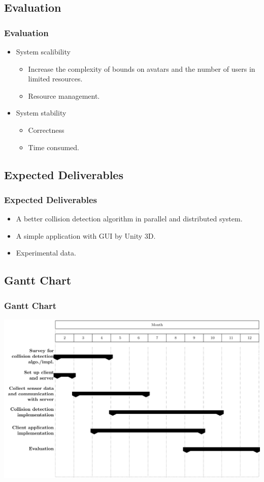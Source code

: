 \documentclass{beamer}
\begin{document}
\subsection{Evaluation}
	\begin{frame}
	\frametitle{Evaluation}
	\begin{itemize}
		\item System scalibility
			\begin{itemize}
				\item Increase the complexity of bounds on avatars and the number of users in limited resources.
				\item Resource management.
			\end{itemize}
		\item System stability
			\begin{itemize}
				\item Correctness
				\item Time consumed.
			\end{itemize}
	\end{itemize}
	\end{frame}

\subsection{Expected Deliverables}
	\begin{frame}
	\frametitle{Expected Deliverables}
	\begin{itemize}
		\item A better collision detection algorithm in parallel and distributed system.
		\item A simple application with GUI by Unity 3D.
		\item Experimental data.
	\end{itemize}
	\end{frame}

\subsection{Gantt Chart}
	\begin{frame}
	\frametitle{Gantt Chart}
	\includegraphics[scale=0.5]{figure/GanttChart.pdf}	
	\end{frame}
\end{document}
